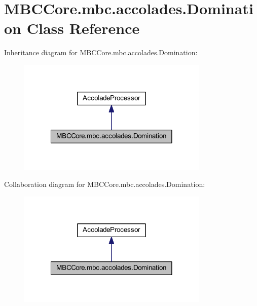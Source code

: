 \hypertarget{class_m_b_c_core_1_1mbc_1_1accolades_1_1_domination}{\section{M\-B\-C\-Core.\-mbc.\-accolades.\-Domination Class Reference}
\label{class_m_b_c_core_1_1mbc_1_1accolades_1_1_domination}
}


Inheritance diagram for M\-B\-C\-Core.\-mbc.\-accolades.\-Domination\-:\nopagebreak
\begin{figure}[H]
\begin{center}
\leavevmode
\includegraphics[width=258pt]{class_m_b_c_core_1_1mbc_1_1accolades_1_1_domination__inherit__graph}
\end{center}
\end{figure}


Collaboration diagram for M\-B\-C\-Core.\-mbc.\-accolades.\-Domination\-:\nopagebreak
\begin{figure}[H]
\begin{center}
\leavevmode
\includegraphics[width=258pt]{class_m_b_c_core_1_1mbc_1_1accolades_1_1_domination__coll__graph}
\end{center}
\end{figure}
